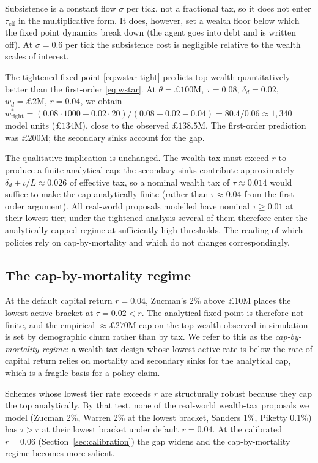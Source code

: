 \documentclass[11pt]{article}
\begin{document}
Subsistence is a constant flow $\sigma$ per tick, not a fractional
tax, so it does not enter $\tau_\text{eff}$ in the multiplicative
form.  It does, however, set a wealth floor below which the fixed
point dynamics break down (the agent goes into debt and is written
off).  At $\sigma = 0.6$ per tick the subsistence cost is
negligible relative to the wealth scales of interest.

The tightened fixed point \eqref{eq:wstar-tight} predicts top
wealth quantitatively better than the first-order
\eqref{eq:wstar}.  At $\theta = \pounds 100$M, $\tau = 0.08$,
$\delta_d = 0.02$, $\bar{w}_d = \pounds 2$M, $r = 0.04$, we obtain
$w^*_\text{tight} = (0.08 \cdot 1000 + 0.02 \cdot 20) / (0.08 +
0.02 - 0.04) = 80.4 / 0.06 \approx 1{,}340$ model units
($\pounds 134$M), close to the observed $\pounds 138.5$M.  The
first-order prediction was $\pounds 200$M; the secondary sinks
account for the gap.

The qualitative implication is unchanged.  The wealth tax must
exceed $r$ to produce a finite analytical cap; the secondary sinks
contribute approximately $\delta_d + \iota/L \approx 0.026$ of
effective tax, so a nominal wealth tax of $\tau \approx 0.014$
would suffice to make the cap analytically finite (rather than
$\tau \approx 0.04$ from the first-order argument).  All real-world
proposals modelled have nominal $\tau \geq 0.01$ at their lowest
tier; under the tightened analysis several of them therefore enter
the analytically-capped regime at sufficiently high thresholds.
The reading of which policies rely on cap-by-mortality and which
do not changes correspondingly.

\subsection{The cap-by-mortality regime}

At the default capital return $r = 0.04$, Zucman's 2\% above
\pounds 10M places the lowest active bracket at $\tau = 0.02 < r$.
The analytical fixed-point is therefore not finite, and the
empirical $\approx \pounds 270$M cap on the top wealth observed in
simulation is set by demographic churn rather than by tax.  We refer
to this as the \emph{cap-by-mortality regime}: a wealth-tax design
whose lowest active rate is below the rate of capital return relies
on mortality and secondary sinks for the analytical cap, which is a
fragile basis for a policy claim.

Schemes whose lowest tier rate exceeds $r$ are structurally robust
because they cap the top analytically.  By that test, none of the
real-world wealth-tax proposals we model (Zucman 2\%, Warren 2\% at
the lowest bracket, Sanders 1\%, Piketty 0.1\%) has $\tau > r$ at
their lowest bracket under default $r = 0.04$.  At the calibrated
$r = 0.06$ (Section~\ref{sec:calibration}) the gap widens and the
cap-by-mortality regime becomes more salient.
\end{document}
